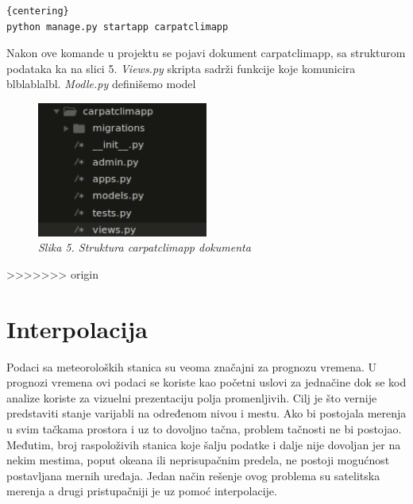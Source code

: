 \documentclass[12pt]{article}
\begin{document}
\begin{lstlisting}{centering}
python manage.py startapp carpatclimapp
\end{lstlisting}Nakon ove komande u projektu se pojavi dokument carpatclimapp, sa strukturom podataka ka na slici 5. \textit{Views.py } skripta sadrži funkcije koje komunicira blblablalbl. \textsl{Modle.py} definišemo model
\begin{figure}[h!]
	\centering
	\includegraphics[width=0.5\textwidth]{app.png}
	\caption*{\textsl{Slika 5. Struktura carpatclimapp dokumenta}}
\end{figure}



  
>>>>>>> origin

\newpage
\section{Interpolacija}

Podaci sa meteoroloških stanica su veoma značajni za prognozu vremena. U prognozi vremena ovi podaci se koriste kao početni uslovi za jednačine dok se kod analize koriste za vizuelni prezentaciju polja promenljivih. Cilj je što vernije predstaviti stanje varijabli na određenom nivou i mestu. Ako bi postojala merenja u svim tačkama prostora i uz to dovoljno tačna, problem tačnosti ne bi postojao. Međutim, broj raspoloživih stanica koje šalju podatke i dalje nije dovoljan jer na nekim mestima, poput okeana ili neprisupačnim predela, ne postoji mogućnost postavljana mernih uređaja. Jedan način rešenje ovog problema su satelitska merenja a drugi pristupačniji je uz pomoć interpolacije.
\end{document}
